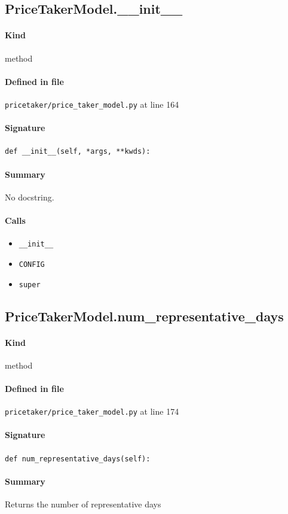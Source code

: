 \documentclass[11pt]{report}
\begin{document}
\subsection{PriceTakerModel.\_\_init\_\_}
\label{def:pricetaker-price_taker_model.py:PriceTakerModel.__init__:L164}
\paragraph{Kind} method
\paragraph{Defined in file} \texttt{pricetaker/price\_taker\_model.py} at line 164
\paragraph{Signature} \texttt{def \_\_init\_\_(self, *args, **kwds):}
\paragraph{Summary} No docstring.
\paragraph{Calls}
\begin{itemize}[leftmargin=*]
  \item \texttt{\_\_init\_\_}
  \item \texttt{CONFIG}
  \item \texttt{super}
\end{itemize}
\subsection{PriceTakerModel.num\_representative\_days}
\label{def:pricetaker-price_taker_model.py:PriceTakerModel.num_representative_days:L174}
\paragraph{Kind} method
\paragraph{Defined in file} \texttt{pricetaker/price\_taker\_model.py} at line 174
\paragraph{Signature} \texttt{def num\_representative\_days(self):}
\paragraph{Summary} Returns the number of representative days
\end{document}
